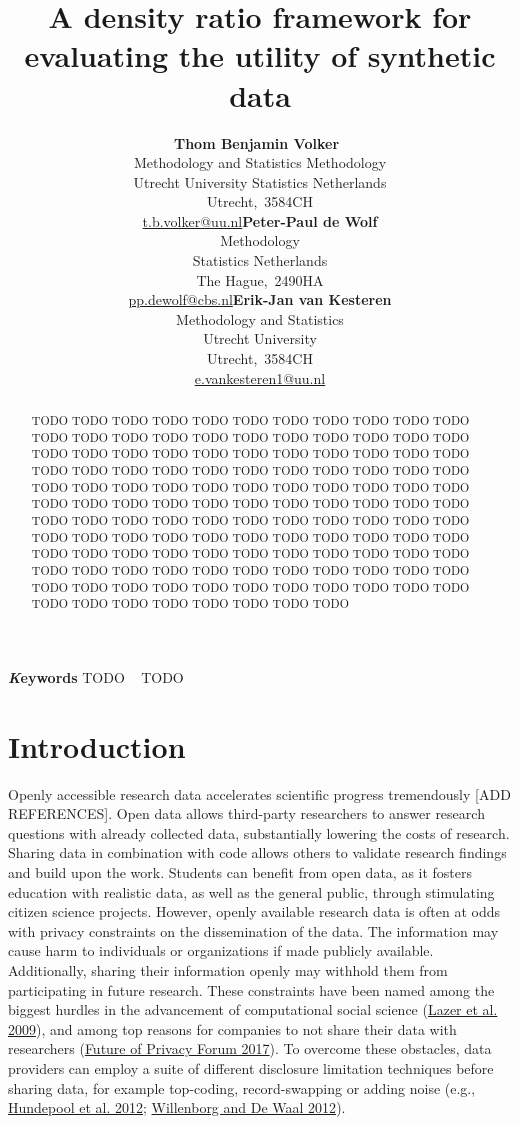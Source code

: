 \documentclass[
]{article}
\title{A density ratio framework for evaluating the utility of synthetic
data}
\author{\textbf{Thom Benjamin
Volker}~\orcidlink{0000-0002-2408-7820}\\Methodology and Statistics
\textbar{} Methodology\\Utrecht University \textbar{} Statistics
Netherlands\\Utrecht,\ 3584CH\\\href{mailto:t.b.volker@uu.nl}{t.b.volker@uu.nl}\asep\textbf{Peter-Paul
de Wolf}\\Methodology\\Statistics Netherlands\\The
Hague,\ 2490HA\\\href{mailto:pp.dewolf@cbs.nl}{pp.dewolf@cbs.nl}\asep\textbf{Erik-Jan
van Kesteren}\\Methodology and Statistics\\Utrecht
University\\Utrecht,\ 3584CH\\\href{mailto:e.vankesteren1@uu.nl}{e.vankesteren1@uu.nl}}
\date{}
\begin{document}
\maketitle
\begin{abstract}
TODO TODO TODO TODO TODO TODO TODO TODO TODO TODO TODO TODO TODO TODO
TODO TODO TODO TODO TODO TODO TODO TODO TODO TODO TODO TODO TODO TODO
TODO TODO TODO TODO TODO TODO TODO TODO TODO TODO TODO TODO TODO TODO
TODO TODO TODO TODO TODO TODO TODO TODO TODO TODO TODO TODO TODO TODO
TODO TODO TODO TODO TODO TODO TODO TODO TODO TODO TODO TODO TODO TODO
TODO TODO TODO TODO TODO TODO TODO TODO TODO TODO TODO TODO TODO TODO
TODO TODO TODO TODO TODO TODO TODO TODO TODO TODO TODO TODO TODO TODO
TODO TODO TODO TODO TODO TODO TODO TODO TODO TODO TODO TODO TODO TODO
TODO TODO TODO TODO TODO TODO TODO TODO TODO TODO TODO TODO TODO TODO
TODO TODO TODO
\end{abstract}
{\bfseries \emph Keywords}
\def\sep{\textbullet\ }
TODO \sep 
TODO

\ifdefined\Shaded\renewenvironment{Shaded}{\begin{tcolorbox}[enhanced, interior hidden, boxrule=0pt, sharp corners, borderline west={3pt}{0pt}{shadecolor}, breakable, frame hidden]}{\end{tcolorbox}}\fi

\hypertarget{introduction}{%
\section{Introduction}\label{introduction}}

Openly accessible research data accelerates scientific progress
tremendously {[}ADD REFERENCES{]}. Open data allows third-party
researchers to answer research questions with already collected data,
substantially lowering the costs of research. Sharing data in
combination with code allows others to validate research findings and
build upon the work. Students can benefit from open data, as it fosters
education with realistic data, as well as the general public, through
stimulating citizen science projects. However, openly available research
data is often at odds with privacy constraints on the dissemination of
the data. The information may cause harm to individuals or organizations
if made publicly available. Additionally, sharing their information
openly may withhold them from participating in future research. These
constraints have been named among the biggest hurdles in the advancement
of computational social science
(\protect\hyperlink{ref-lazer_css_2009}{Lazer et al. 2009}), and among
top reasons for companies to not share their data with researchers
(\protect\hyperlink{ref-fpf_2017}{Future of Privacy Forum 2017}). To
overcome these obstacles, data providers can employ a suite of different
disclosure limitation techniques before sharing data, for example
top-coding, record-swapping or adding noise (e.g.,
\protect\hyperlink{ref-hundepool_disclosure_2012}{Hundepool et al.
2012}; \protect\hyperlink{ref-willenborg_elements_2012}{Willenborg and
De Waal 2012}).
\end{document}
